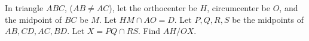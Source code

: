 In triangle $ABC$, ($AB \ne AC$), let the orthocenter be $H$, circumcenter be $O$, and the midpoint of $BC$ be $M$. Let $HM \cap AO = D$. Let $P,Q,R,S$ be the midpoints of $AB,CD,AC,BD$. Let $X = PQ\cap  RS$. Find $AH/OX$.
